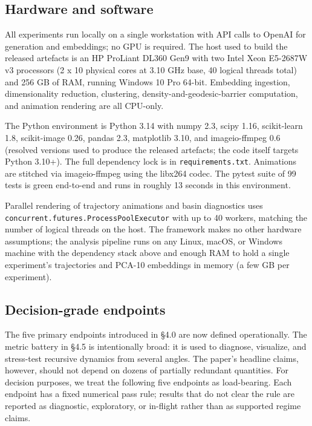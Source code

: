 \documentclass{article}
\theoremstyle{plain}
\theoremstyle{definition}
\begin{document}
\subsection{Hardware and software}

All experiments run locally on a single workstation with API calls to OpenAI for generation and embeddings; no GPU is required. The host used to build the released artefacts is an HP ProLiant DL360 Gen9 with two Intel Xeon E5-2687W v3 processors (2 x 10 physical cores at 3.10 GHz base, 40 logical threads total) and 256 GB of RAM, running Windows 10 Pro 64-bit. Embedding ingestion, dimensionality reduction, clustering, density-and-geodesic-barrier computation, and animation rendering are all CPU-only.

The Python environment is Python 3.14 with numpy 2.3, scipy 1.16, scikit-learn 1.8, scikit-image 0.26, pandas 2.3, matplotlib 3.10, and imageio-ffmpeg 0.6 (resolved versions used to produce the released artefacts; the code itself targets Python 3.10+). The full dependency lock is in \texttt{requirements.txt}. Animations are stitched via imageio-ffmpeg using the libx264 codec. The pytest suite of 99 tests is green end-to-end and runs in roughly 13 seconds in this environment.

Parallel rendering of trajectory animations and basin diagnostics uses \texttt{concurrent.futures.ProcessPoolExecutor} with up to 40 workers, matching the number of logical threads on the host. The framework makes no other hardware assumptions; the analysis pipeline runs on any Linux, macOS, or Windows machine with the dependency stack above and enough RAM to hold a single experiment's trajectories and PCA-10 embeddings in memory (a few GB per experiment).

\subsection{Decision-grade endpoints}

The five primary endpoints introduced in §4.0 are now defined operationally. The metric battery in §4.5 is intentionally broad: it is used to diagnose, visualize, and stress-test recursive dynamics from several angles. The paper's headline claims, however, should not depend on dozens of partially redundant quantities. For decision purposes, we treat the following five endpoints as load-bearing. Each endpoint has a fixed numerical pass rule; results that do not clear the rule are reported as diagnostic, exploratory, or in-flight rather than as supported regime claims.
\end{document}
